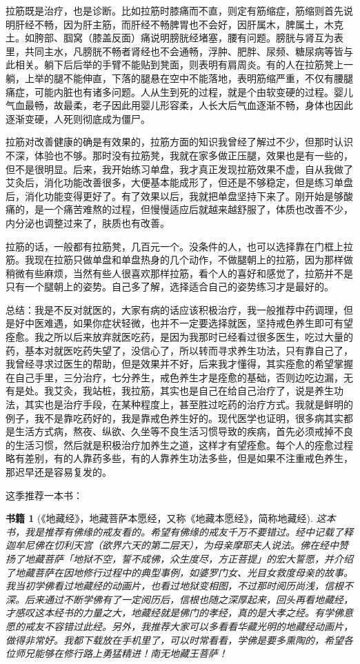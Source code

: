 \documentclass[fontset=founder]{ctexart}
\newtheorem{book}{书籍}
\begin{document}
拉筋既是治疗，也是诊断。比如拉筋时膝痛而不直，则定有筋缩症，筋缩则首先说明肝经不畅，因为肝主筋，而肝经不畅脾胃也不会好，因肝属木，脾属土，木克土。如胯部、腘窝（膝盖反面）痛说明膀胱经堵塞，腰有问题。膀胱与肾互为表里，共同主水，凡膀胱不畅者肾经也不会通畅，浮肿、肥胖、尿频、糖尿病等皆与此相关。躺下后后举的手臂不能贴到凳面，则表明有肩周炎。有的人在拉筋凳上一躺，上举的腿不能伸直，下落的腿悬在空中不能落地，表明筋缩严重，不仅有腰腿痛症，可能内脏也有诸多问题。人从生到死的过程，就是个由软变硬的过程。婴儿气血最畅，故最柔，老子因此用婴儿形容柔，人长大后气血逐渐不畅，身体也因此逐渐变硬，人死则彻底成为僵尸。

拉筋对改善健康的确是有效果的，拉筋方面的知识我曾经了解过不少，但那时认识不深，体验也不够。那时没有拉筋凳，我就在家多做正压腿，效果也是有一些的，但不是很明显。后来，我开始练习单盘，我才真正发现拉筋效果不虚，自从我做了艾灸后，消化功能改善很多，大便基本能成形了，但还是不够稳定，但是练习单盘后，消化功能变得更好了。有了效果以后，我就把单盘坚持下来了。刚开始是够酸痛的，是一个痛苦难熬的过程，但慢慢适应后就越来越舒服了，体质也改善不少，内分泌也调整过来了，肤质也有改善。

拉筋的话，一般都有拉筋凳，几百元一个。没条件的人，也可以选择靠在门框上拉筋。我现在拉筋只做单盘和单盘热身的几个动作，不做腿朝上的拉筋，因为那样做稍微有些麻烦，当然有些人很喜欢那样拉筋，看个人的喜好和感觉了，拉筋并不是只有一个腿朝上的姿势。自己多了解，选择适合自己的姿势练习才是最好的。

总结：我是不反对就医的，大家有病的话应该积极治疗，我一般推荐中药调理，但是好中医难遇，如果你症状轻微，也并不一定要选择就医，坚持戒色养生即可有望痊愈。我之所以后来放弃就医吃药，是因为我那时已经看过很多医生，吃过大量的药，基本对就医吃药失望了，没信心了，所以转而寻求养生功法，只有靠自己了，我曾经寻求过医生的帮助，但是效果并不好，后来我才懂得，其实痊愈的希望掌握在自己手里，三分治疗，七分养生，戒色养生才是痊愈的基础，否则边吃边漏，无有是处。我艾灸，我站桩，我拉筋，其实也是自己在给自己治疗了，说是养生功法，其实也是治疗手段，在某种程度上，甚至胜过吃药的治疗方式。我就是鲜明的例子，我不是靠吃药好的，我是靠戒色养生好的。现代医学也证明，很多病其实都是生活方式病，熬夜、纵欲、久坐等不良生活习惯导致的疾病，首先必须戒掉不良的生活习惯，然后就是积极治疗加养生之道，这样才有望痊愈。每个人的痊愈过程略有差别，有的人靠药多些，有的人靠养生功法多些，但是如果不注重戒色养生，那迟早还是容易复发的。

这季推荐一本书：

\begin{book}[《地藏经》，地藏菩萨本愿经，又称《地藏本愿经》，简称地藏经]
    这本书，我是推荐有佛缘的戒友看的。希望有佛缘的戒友千万不要错过。经中记载了释迦牟尼佛在忉利天宫（欲界六天的第二层天），为母亲摩耶夫人说法。佛在经中赞扬了地藏菩萨「地狱不空，誓不成佛，众生度尽，方正菩提」的宏大誓愿，并介绍了地藏菩萨在因地修行过程中的典型事例，如婆罗门女、光目女救度母亲的故事。我当初学佛看过地藏经的动画片，也看过地狱变相图，不过那时阅历尚浅，信根不深。后来通过不断学佛有了一定阅历后，信根也随之深厚起来，回头再看地藏经，才感叹这本经书的力量之大，地藏经就是佛门的孝经，真的是大孝之经。有学佛意愿的戒友不容错过此经。另外，我推荐大家可以多看看华藏光明的地藏经动画片，做得非常好。我都下载放在手机里了，可以时常看看，学佛是要多熏陶的，希望各位师兄能够在修行路上勇猛精进！南无地藏王菩萨！
\end{book}
\end{document}
